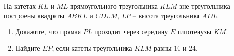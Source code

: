 \begin{ex}
	\begin{condition}
		На катетах \( KL  \) и \( ML  \) прямоугольного треугольника \( KLM  \) вне треугольника построены квадраты \( ABKL  \) и \( CDLM \), \( LP \) – высота треугольника \( ADL \).
		\begin{enumerate}
			\item Докажите, что прямая \( PL  \) проходит через середину \( E  \) гипотенузы \( KM \).
			\item Найдите \( EP \), если катеты треугольника \( KLM \) равны \( 10 \) и \( 24 \).
		\end{enumerate}
	\end{condition}
\end{ex}